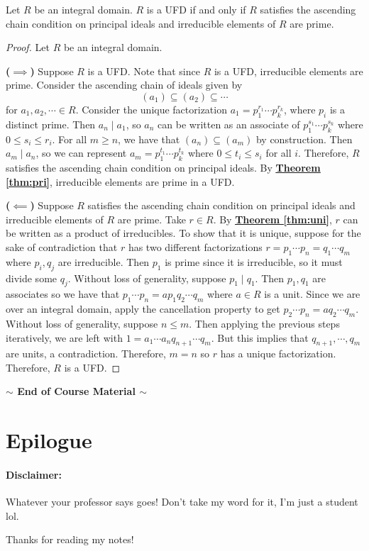 \documentclass [12pt]{article}
\newcounter{thmcounter}[section]
\renewcommand{\thethmcounter}{\thesection.\arabic{thmcounter}}
\newenvironment{theorem}[1]{
  \refstepcounter{thmcounter}
  \begin{tcolorbox}[title={Theorem \thethmcounter: #1}, colback=green!5!white, colframe=black!75!green]
}{ \end{tcolorbox} }
\renewcommand{\href}[2]{\hyperref[#1]{\bf{\underline{{#2}}}}}
\renewcommand{\bf}[1]{\textbf{{#1}}}
\begin{document}
\newpage
\begin{theorem}{}
    Let $R$ be an integral domain. $R$ is a UFD if and only if $R$ satisfies the ascending chain
    condition on principal ideals and irreducible elements of $R$ are prime.
\end{theorem}
\begin{proof}
    Let $R$ be an integral domain.
    \vspace{0.5em}

    \bf{($\bm{\implies}$)}
    Suppose $R$ is a UFD. Note that since $R$ is a UFD, irreducible elements are prime.
    Consider the ascending chain of ideals given by
    \[(a_1) \subseteq (a_2) \subseteq \cdots\]
    for $a_1, a_2, \cdots \in R$. Consider the unique factorization
    $a_1 = p_1^{r_1} \cdots p_k^{r_k}$, where $p_i$ is a distinct prime. Then $a_n \mid a_1$, so
    $a_n$ can be written as an associate of $p_1^{s_1} \cdots p_k^{s_k}$ where
    $0 \leq s_i \leq r_i$. For all $m \geq n$, we have that $(a_n) \subseteq (a_m)$ by construction.
    Then $a_m \mid a_n$, so we can represent $a_m = p_1^{t_1} \cdots p_k^{t_k}$ where
    $0 \leq t_i \leq s_i$ for all $i$. Therefore, $R$ satisfies the ascending chain condition on
    principal ideals. By \href{thm:pri}{Theorem \ref{thm:pri}}, irreducible elements are prime in a
    UFD.
    \vspace{0.5em}

    \bf{($\bm{\impliedby}$)}
    Suppose $R$ satisfies the ascending chain condition on principal ideals and irreducible elements
    of $R$ are prime. Take $r \in R$. By \href{thm:uni}{Theorem \ref{thm:uni}}, $r$ can be written
    as a product of irreducibles. To show that it is unique, suppose for the sake of contradiction
    that $r$ has two different factorizations $r = p_1 \cdots p_n = q_1 \cdots q_m$ where $p_i, q_j$
    are irreducible. Then $p_1$ is prime since it is irreducible, so it must divide some $q_j$.
    Without loss of generality, suppose $p_1 \mid q_1$. Then $p_1, q_1$ are associates so we have
    that $p_1 \cdots p_n = ap_1 q_2 \cdots q_m$ where $a \in R$ is a unit. Since we are over an
    integral domain, apply the cancellation property to get $p_2 \cdots p_n = aq_2 \cdots q_m$.
    Without loss of generality, suppose $n \leq m$. Then applying the previous steps iteratively, we
    are left with $1 = a_1 \cdots a_n q_{n + 1} \cdots q_m$. But this implies that
    $q_{n + 1}, \cdots, q_m$ are units, a contradiction. Therefore, $m = n$ so $r$ has a unique
    factorization. Therefore, $R$ is a UFD.
\end{proof}
\begin{center}
    \vspace{5em}
    \bf{$\bm{\sim}$ End of Course Material $\bm{\sim}$}
\end{center}

\newpage
\section{Epilogue}
\paragraph{Disclaimer:} Whatever your professor says goes! Don't take my word for it, I'm just a
student lol.
\vspace{1em}

Thanks for reading my notes!
\end{document}
